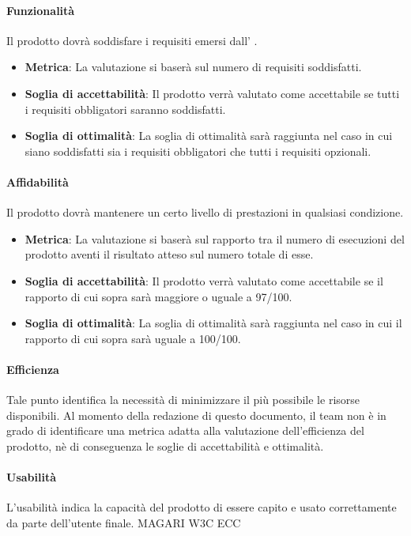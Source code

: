 \paragraph{Funzionalità}
Il prodotto dovrà soddisfare i requisiti emersi dall' \AdR .
\begin{itemize}
	\item \textbf{Metrica}: La valutazione si baserà sul numero di requisiti soddisfatti.
	\item \textbf{Soglia di accettabilità}: Il prodotto verrà valutato come accettabile se tutti i requisiti obbligatori saranno soddisfatti.
	\item \textbf{Soglia di ottimalità}: La soglia di ottimalità sarà raggiunta nel caso in cui siano soddisfatti sia i requisiti obbligatori che tutti i requisiti opzionali.
\end{itemize}

\paragraph{Affidabilità}
Il prodotto dovrà mantenere un certo livello di prestazioni in qualsiasi condizione.
\begin{itemize}
	\item \textbf{Metrica}: La valutazione si baserà sul rapporto tra il numero di esecuzioni del prodotto aventi il risultato atteso sul numero totale di esse.
	\item \textbf{Soglia di accettabilità}: Il prodotto verrà valutato come accettabile se il rapporto di cui sopra sarà maggiore o uguale a 97/100.
	\item \textbf{Soglia di ottimalità}: La soglia di ottimalità sarà raggiunta nel caso in cui il rapporto di cui sopra sarà uguale a 100/100.
\end{itemize}

\paragraph{Efficienza}
Tale punto identifica la necessità di minimizzare il più possibile le risorse disponibili.
Al momento della redazione di questo documento, il team non è in grado di identificare una metrica adatta alla valutazione dell'efficienza del prodotto, nè di conseguenza le soglie di accettabilità e ottimalità.

\paragraph{Usabilità}
L'usabilità indica la capacità del prodotto di essere capito e usato correttamente da parte dell'utente finale.
MAGARI W3C ECC


